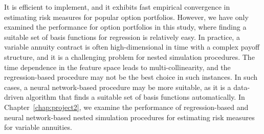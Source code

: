 It is efficient to implement, and it exhibits fast empirical convergence in estimating risk measures for popular option portfolios. 
However, we have only examined the performance for option portfolios in this study, where finding a suitable set of basis functions for regression is relatively easy.
In practice, a variable annuity contract is often high-dimensional in time with a complex payoff structure, and it is a challenging problem for nested simulation procedures.
The time dependence in the feature space leads to multi-collinearity, and the regression-based procedure may not be the best choice in such instances.
In such cases, a neural network-based procedure may be more suitable, as it is a data-driven algorithm that finds a suitable set of basis functions automatically.
In Chapter~\ref{chap:project2}, we examine the performance of regression-based and neural network-based nested simulation procedures for estimating risk measures for variable annuities.

